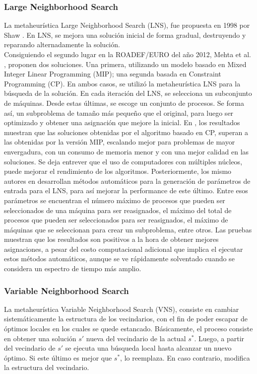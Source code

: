 \subsubsection{Large Neighborhood Search}
La metaheurística Large Neighborhood Search (LNS), fue propuesta en 1998 por Shaw \cite{shaw1998using}. En LNS, se mejora una solución inicial de forma gradual, destruyendo y reparando alternadamente la solución.\\
Consiguiendo el segundo lugar en la ROADEF/EURO del año 2012, Mehta et al. \cite{mehta2012comparing}, proponen dos soluciones. Una primera, utilizando un modelo basado en Mixed Integer Linear Programming (MIP); una segunda basada en Constraint Programming (CP). En ambos casos, se utilizó la metaheurística LNS para la búsqueda de la solución. En cada iteración del LNS, se selecciona un subconjunto de máquinas. Desde estas últimas, se escoge un conjunto de procesos. Se forma así, un subproblema de tamaño más pequeño que el original, para luego ser optimizado y obtener una asignación que mejore la inicial. 
En \cite{mehta2012comparing}, los resultados muestran que las soluciones obtenidas por el algoritmo basado en CP, superan a las obtenidas por la versión MIP, escalando mejor para problemas de mayor envergadura, con un consumo de memoria menor y con una mejor calidad en las soluciones. Se deja entrever que el uso de computadores con múltiples núcleos, puede mejorar el rendimiento de los algoritmos. Posteriormente, los mismo autores en \cite{malitsky2013tuning} desarrollan métodos automáticos para la generación de parámetros de entrada para el LNS, para así mejorar la performance de este último. Entre esos parámetros se encuentran el número máximo de procesos que pueden ser seleccionados de una máquina para ser reasignados, el máximo del total de procesos que pueden ser seleccionados para ser reasignados, el máximo de máquinas que se seleccionan para crear un subproblema, entre otros. Las pruebas muestran que los resultados son positivos a la hora de obtener mejores asignaciones, a pesar del costo computacional adicional que implica el ejecutar estos métodos automáticos, aunque se ve rápidamente solventado cuando se considera un espectro de tiempo más amplio. \\

\subsubsection{Variable Neighborhood Search}
La metaheurística Variable Neighborhood Search (VNS), consiste en cambiar sistemáticamente la estructura de los vecindarios, con el fin de poder escapar de óptimos locales en los cuales se quede estancado. Básicamente, el proceso consiste en obtener una solución $s'$ nueva del vecindario de la actual $s^{*}$. Luego, a partir del vecindario de $s'$ se ejecuta una búsqueda local hasta alcanzar un nuevo óptimo. Si este último es mejor que $s^{*}$, lo reemplaza. En caso contrario, modifica la estructura del vecindario. \\
  
